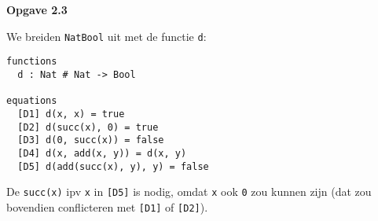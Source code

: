 \documentclass[a4paper,11pt]{article}
\begin{document}
{\bf Opgave 2.3}

We breiden \verb|NatBool| uit met de functie \verb|d|:

\begin{verbatim}
functions
  d : Nat # Nat -> Bool

equations
  [D1] d(x, x) = true
  [D2] d(succ(x), 0) = true
  [D3] d(0, succ(x)) = false
  [D4] d(x, add(x, y)) = d(x, y)
  [D5] d(add(succ(x), y), y) = false
\end{verbatim}

De \verb|succ(x)| ipv \verb|x| in \verb|[D5]| is nodig, omdat \verb|x| ook
\verb|0| zou kunnen zijn (dat zou bovendien conflicteren met \verb|[D1]| of \verb|[D2]|).
\end{document}
